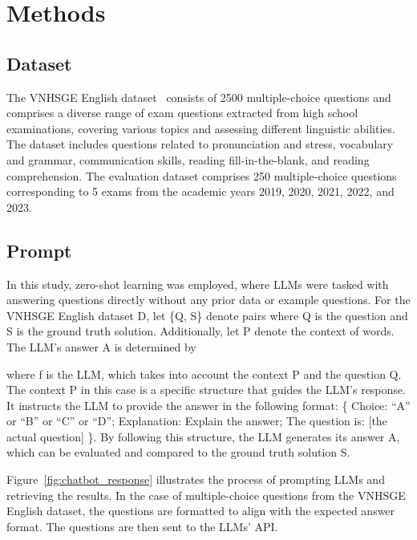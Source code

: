 \documentclass[11pt]{article}
\begin{document}
\section{Methods}

\subsection{Dataset}


The VNHSGE English dataset~\cite{dao2023vnhsge} consists of 2500 multiple-choice questions and comprises a diverse range of exam questions extracted from high school examinations, covering various topics and assessing different linguistic abilities. The dataset includes questions related to pronunciation and stress, vocabulary and grammar, communication skills, reading fill-in-the-blank, and reading comprehension. The evaluation dataset comprises 250 multiple-choice questions corresponding to 5 exams from the academic years 2019, 2020, 2021, 2022, and 2023.

\subsection{Prompt}

In this study, zero-shot learning was employed, where LLMs were tasked with answering questions directly without any prior data or example questions. For the VNHSGE English dataset D, let \{Q, S\} denote pairs where Q is the question and S is the ground truth solution. Additionally, let P denote the context of words. The LLM's answer A is determined by

where f is the LLM, which takes into account the context P and the question Q. The context P in this case is a specific structure that guides the LLM’s response. It instructs the LLM to provide the answer in the following format: \{ Choice: “A” or “B” or “C” or “D”;
	Explanation: Explain the answer;
	The question is: [the actual question] \}. By following this structure, the LLM generates its answer A, which can be evaluated and compared to the ground truth solution S.

Figure~\ref{fig:chatbot_response} illustrates the process of prompting LLMs and retrieving the results. In the case of multiple-choice questions from the VNHSGE English dataset, the questions are formatted to align with the expected answer format. The questions are then sent to the LLMs' API.
\end{document}

